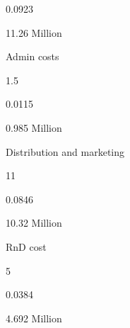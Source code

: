 \documentclass[a4paper,portrait,12pt]{article}
\begin{document}
0.0923





\begin{flushleft}
11.26 Million
\end{flushleft}





\begin{flushleft}
Admin costs
\end{flushleft}





1.5





0.0115





\begin{flushleft}
0.985 Million
\end{flushleft}





\begin{flushleft}
Distribution and marketing
\end{flushleft}





11





0.0846





\begin{flushleft}
10.32 Million
\end{flushleft}





\begin{flushleft}
RnD cost
\end{flushleft}





5





0.0384





\begin{flushleft}
4.692 Million
\end{flushleft}
\end{document}
